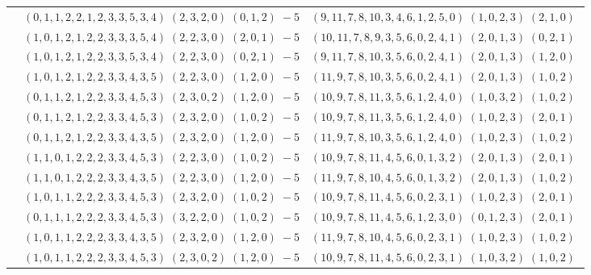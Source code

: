 \documentclass[11pt]{article}
\begin{document}
\begin{longtable}[l]{|c|c|c|}
 \cline{2-3} 
 & $(0 ,1 ,1 ,2 ,2 ,1 ,2 ,3 ,3 ,5 ,3 ,4) \;(2 ,3 ,2 ,0) \;(0 ,1 ,2) \;-5$ & $(9 ,11 ,7 ,8 ,10 ,3 ,4 ,6 ,1 ,2 ,5 ,0) \;(1 ,0 ,2 ,3) \;(2 ,1 ,0) \;$\\ 
 \cline{2-3} 
 & $(1 ,0 ,1 ,2 ,1 ,2 ,2 ,3 ,3 ,3 ,5 ,4) \;(2 ,2 ,3 ,0) \;(2 ,0 ,1) \;-5$ & $(10 ,11 ,7 ,8 ,9 ,3 ,5 ,6 ,0 ,2 ,4 ,1) \;(2 ,0 ,1 ,3) \;(0 ,2 ,1) \;$\\ 
 \cline{2-3} 
 & $(1 ,0 ,1 ,2 ,1 ,2 ,2 ,3 ,3 ,5 ,3 ,4) \;(2 ,2 ,3 ,0) \;(0 ,2 ,1) \;-5$ & $(9 ,11 ,7 ,8 ,10 ,3 ,5 ,6 ,0 ,2 ,4 ,1) \;(2 ,0 ,1 ,3) \;(1 ,2 ,0) \;$\\ 
 \cline{2-3} 
 & $(1 ,0 ,1 ,2 ,1 ,2 ,2 ,3 ,3 ,4 ,3 ,5) \;(2 ,2 ,3 ,0) \;(1 ,2 ,0) \;-5$ & $(11 ,9 ,7 ,8 ,10 ,3 ,5 ,6 ,0 ,2 ,4 ,1) \;(2 ,0 ,1 ,3) \;(1 ,0 ,2) \;$\\ 
 \cline{2-3} 
 & $(0 ,1 ,1 ,2 ,1 ,2 ,2 ,3 ,3 ,4 ,5 ,3) \;(2 ,3 ,0 ,2) \;(1 ,2 ,0) \;-5$ & $(10 ,9 ,7 ,8 ,11 ,3 ,5 ,6 ,1 ,2 ,4 ,0) \;(1 ,0 ,3 ,2) \;(1 ,0 ,2) \;$\\ 
 \cline{2-3} 
 & $(0 ,1 ,1 ,2 ,1 ,2 ,2 ,3 ,3 ,4 ,5 ,3) \;(2 ,3 ,2 ,0) \;(1 ,0 ,2) \;-5$ & $(10 ,9 ,7 ,8 ,11 ,3 ,5 ,6 ,1 ,2 ,4 ,0) \;(1 ,0 ,2 ,3) \;(2 ,0 ,1) \;$\\ 
 \cline{2-3} 
 & $(0 ,1 ,1 ,2 ,1 ,2 ,2 ,3 ,3 ,4 ,3 ,5) \;(2 ,3 ,2 ,0) \;(1 ,2 ,0) \;-5$ & $(11 ,9 ,7 ,8 ,10 ,3 ,5 ,6 ,1 ,2 ,4 ,0) \;(1 ,0 ,2 ,3) \;(1 ,0 ,2) \;$\\ 
 \cline{2-3} 
 & $(1 ,1 ,0 ,1 ,2 ,2 ,2 ,3 ,3 ,4 ,5 ,3) \;(2 ,2 ,3 ,0) \;(1 ,0 ,2) \;-5$ & $(10 ,9 ,7 ,8 ,11 ,4 ,5 ,6 ,0 ,1 ,3 ,2) \;(2 ,0 ,1 ,3) \;(2 ,0 ,1) \;$\\ 
 \cline{2-3} 
 & $(1 ,1 ,0 ,1 ,2 ,2 ,2 ,3 ,3 ,4 ,3 ,5) \;(2 ,2 ,3 ,0) \;(1 ,2 ,0) \;-5$ & $(11 ,9 ,7 ,8 ,10 ,4 ,5 ,6 ,0 ,1 ,3 ,2) \;(2 ,0 ,1 ,3) \;(1 ,0 ,2) \;$\\ 
 \cline{2-3} 
 & $(1 ,0 ,1 ,1 ,2 ,2 ,2 ,3 ,3 ,4 ,5 ,3) \;(2 ,3 ,2 ,0) \;(1 ,0 ,2) \;-5$ & $(10 ,9 ,7 ,8 ,11 ,4 ,5 ,6 ,0 ,2 ,3 ,1) \;(1 ,0 ,2 ,3) \;(2 ,0 ,1) \;$\\ 
 \cline{2-3} 
 & $(0 ,1 ,1 ,1 ,2 ,2 ,2 ,3 ,3 ,4 ,5 ,3) \;(3 ,2 ,2 ,0) \;(1 ,0 ,2) \;-5$ & $(10 ,9 ,7 ,8 ,11 ,4 ,5 ,6 ,1 ,2 ,3 ,0) \;(0 ,1 ,2 ,3) \;(2 ,0 ,1) \;$\\ 
 \cline{2-3} 
 & $(1 ,0 ,1 ,1 ,2 ,2 ,2 ,3 ,3 ,4 ,3 ,5) \;(2 ,3 ,2 ,0) \;(1 ,2 ,0) \;-5$ & $(11 ,9 ,7 ,8 ,10 ,4 ,5 ,6 ,0 ,2 ,3 ,1) \;(1 ,0 ,2 ,3) \;(1 ,0 ,2) \;$\\ 
 \cline{2-3} 
 & $(1 ,0 ,1 ,1 ,2 ,2 ,2 ,3 ,3 ,4 ,5 ,3) \;(2 ,3 ,0 ,2) \;(1 ,2 ,0) \;-5$ & $(10 ,9 ,7 ,8 ,11 ,4 ,5 ,6 ,0 ,2 ,3 ,1) \;(1 ,0 ,3 ,2) \;(1 ,0 ,2) \;$\\ 

\end{longtable}
\end{document}

